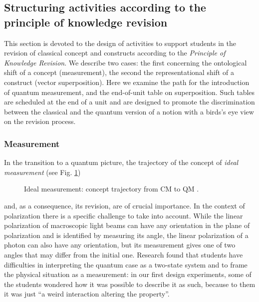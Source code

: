 \documentclass[twocolumn,secnumarabic,amssymb, nobibnotes, aps, prd, nofootinbib]{revtex4-2}
\begin{document}
\subsection{Structuring activities according to the principle of knowledge revision} \label{Sec:3.2}

This section is devoted to the design of activities to support students in the revision of classical concept and constructs according to the \emph{Principle of Knowledge Revision}. We describe two cases: the first concerning the ontological shift of a concept (measurement), the second the representational shift of a construct (vector superposition). Here we examine the path for the introduction of quantum measurement, and the end-of-unit table on superposition. Such tables are scheduled at the end of a unit and are designed to promote the discrimination between the classical and the quantum version of a notion with a birds's eye view on the revision process.


\subsubsection{Measurement} \label{Sec:3.2.1}
In the transition to a quantum picture, the trajectory of the concept of \emph{ideal measurement} (see Fig. \ref{FIG:12})
\begin{figure}[!htpb]
    \caption{Ideal measurement: concept trajectory from CM to QM \cite{Zuccarini2022}.}
    \label{FIG:12}
\end{figure}
and, as a consequence, its revision, are of crucial importance. In the context of polarization there is a specific challenge to take into account. While the linear polarization of macroscopic light beams can have any orientation in the plane of polarization and is identified by measuring its angle, the linear polarization of a photon can also have any orientation, but its measurement gives one of two angles that may differ from the initial one. Research found that students have difficulties in interpreting the quantum case as a two-state system \cite{Singh2015} and to frame the physical situation as a measurement: in our first design experiments, some of the students wondered how it was possible to describe it as such, because to them it was just ``a weird interaction altering the property''.
\end{document}
